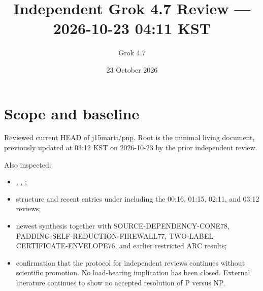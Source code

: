 \documentclass[11pt]{article}
\title{Independent Grok 4.7 Review --- 2026-10-23 04:11 KST}
\author{Grok 4.7}
\date{23 October 2026}
\begin{document}
\maketitle

\begin{center}
\end{center}

\section{Scope and baseline}
Reviewed current HEAD of j15marti/pnp. Root  is the minimal living document, previously updated at 03:12 KST on 2026-10-23 by the prior independent review.

Also inspected:
\begin{itemize}
\item {}, , ;
\item structure and recent entries under  including the 00:16, 01:15, 02:11, and 03:12 reviews;
\item newest synthesis  together with SOURCE-DEPENDENCY-CONE78, PADDING-SELF-REDUCTION-FIREWALL77, TWO-LABEL-CERTIFICATE-ENVELOPE76, and earlier restricted ARC results;
\item confirmation that the protocol for independent reviews continues without scientific promotion. No load-bearing implication has been closed. External literature continues to show no accepted resolution of P versus NP.
\end{itemize}
\end{document}
